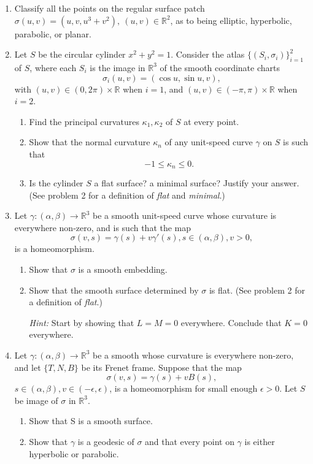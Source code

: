 \documentclass{article}
\begin{document}
\begin{enumerate}
\item
Classify all the points on the regular surface patch $\sigma(u,v) = (u,v,u^3+v^2), \ (u,v) \in \mathbb{R}^2$, as to being elliptic, hyperbolic, parabolic, or planar.

\item
Let $S$ be the circular cylinder $x^2+y^2=1$. Consider the atlas $\{ (S_i, \sigma_i)\}_{i=1}^2$ of $S$,
where each $S_i$ is the image in $\mathbb{R}^3$ of the smooth coordinate charts
\[ \sigma_i(u,v) = (\cos u, \sin u, v), \]
with $(u,v) \in (0,2\pi) \times \mathbb{R}$ when $i=1$, 
and $(u,v) \in (-\pi,\pi) \times \mathbb{R}$ when $i=2$.
\begin{enumerate}
\item
Find the principal curvatures $\kappa_1, \kappa_2$ of $S$ at every point.

\item
Show that the normal curvature $\kappa_n$ of any unit-speed curve $\gamma$ on $S$ is such that
\[ -1 \leq \kappa_n \leq 0.\]

\item
Is the cylinder $S$ a flat surface? a minimal surface? Justify your answer. (See problem 2 for a definition of {\em flat} and {\em minimal}.)
\end{enumerate}

\item
Let $\gamma: (\alpha,\beta) \rightarrow \mathbb{R}^3$ be a smooth unit-speed curve whose curvature is everywhere non-zero, and is such that the map 
\[ \sigma(v,s) = \gamma(s) + v\gamma'(s), s \in (\alpha,\beta), v > 0,\]
is a homeomorphism.
\begin{enumerate}
\item
Show that $\sigma$ is  a smooth embedding.

\item
Show that the smooth surface determined by $\sigma$ is flat. (See problem 2 for a definition of {\em flat}.)

{\em Hint:} Start by showing that $L=M=0$ everywhere. Conclude that $K = 0$ everywhere.
\end{enumerate}

\item 
Let $\gamma: (\alpha, \beta) \rightarrow \mathbb{R}^3$ be a smooth whose curvature is everywhere non-zero, and let $\{ T,N,B \}$
be its Frenet frame. Suppose that the map
\[ \sigma(v,s) = \gamma(s) + vB(s),\]
$s \in (\alpha, \beta) , v \in (-\epsilon,\epsilon)$, is a homeomorphism for small enough $\epsilon > 0$. Let $S$ be image of $\sigma$ in $\mathbb{R}^3$.
\begin{enumerate}
\item Show that S is a smooth surface.
\item Show that $\gamma$ is a geodesic of $\sigma$ and that every point on $\gamma$ is either hyperbolic or parabolic.
\end{enumerate}



\end{enumerate}
\end{document}
